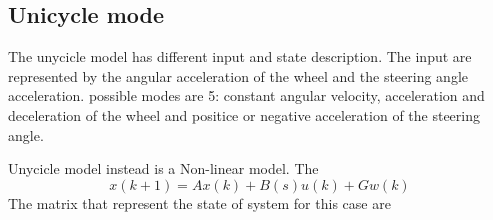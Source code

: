 \documentclass[twocolumn]{article}
\begin{document}
\subsection*{Unicycle mode}
    The unycicle model has different input and state description. The input are represented by the angular acceleration of the wheel and the steering angle acceleration.
    possible modes are 5: constant angular velocity, acceleration and deceleration of the wheel and positice or negative acceleration of the steering angle.
    \begin{center}
    \end{center}
    Unycicle model instead is a Non-linear model. The  %
    \begin{equation}
        x(k+1)= Ax(k) + B(s)u(k) + Gw(k)
    \end{equation}
    The matrix that represent the state of system for this case are
\end{document}
